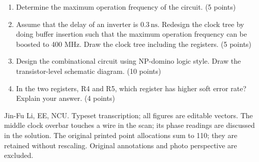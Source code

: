 \documentclass[10pt]{article}
\begin{document}
\begin{enumerate}[label=(\alph*),leftmargin=7mm,itemsep=4pt]
\item Determine the maximum operation frequency of the circuit. (5 points)
\item Assume that the delay of an inverter is $0.3\,\mathrm{ns}$. Redesign the clock tree by doing buffer insertion such that the maximum operation frequency can be boosted to 400 MHz. Draw the clock tree including the registers. (5 points)
\item Design the combinational circuit using NP-domino logic style. Draw the transistor-level schematic diagram. (10 points)
\item In the two registers, R4 and R5, which register has higher soft error rate? Explain your answer. (4 points)
\end{enumerate}
\vfill\small Jin-Fu Li, EE, NCU. Typeset transcription; all figures are editable vectors. The middle clock overbar touches a wire in the scan; its phase readings are discussed in the solution. The original printed point allocations sum to 110; they are retained without rescaling. Original annotations and photo perspective are excluded.
\end{document}
